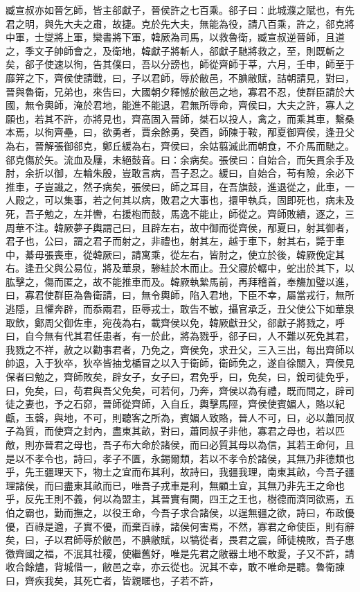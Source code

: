 \begin{pinyinscope}
臧宣叔亦如晉乞師，皆主郤獻子，晉侯許之七百乘。郤子曰：此城濮之賦也，有先君之明，與先大夫之肅，故捷。克於先大夫，無能為役，請八百乘，許之，郤克將中軍，士燮將上軍，欒書將下軍，韓厥為司馬，以救魯衛，臧宣叔逆晉師，且道之，季文子帥師會之，及衛地，韓獻子將斬人，郤獻子馳將救之，至，則既斬之矣，郤子使速以徇，告其僕曰，吾以分謗也，師從齊師于莘，六月，壬申，師至于靡笄之下，齊侯使請戰，曰，子以君師，辱於敝邑，不腆敝賦，詰朝請見，對曰，晉與魯衛，兄弟也，來告曰，大國朝夕釋憾於敝邑之地，寡君不忍，使群臣請於大國，無令輿師，淹於君地，能進不能退，君無所辱命，齊侯曰，大夫之許，寡人之願也，若其不許，亦將見也，齊高固入晉師，桀石以投人，禽之，而乘其車，繫桑本焉，以徇齊壘，曰，欲勇者，賈余餘勇，癸酉，師陳于鞍，邴夏御齊侯，逢丑父為右，晉解張御郤克，鄭丘緩為右，齊侯曰，余姑翦滅此而朝食，不介馬而馳之。郤克傷於矢。流血及屨，未絕鼓音。曰：余病矣。張侯曰：自始合，而矢貫余手及肘，余折以御，左輪朱殷，豈敢言病，吾子忍之。緩曰，自始合，苟有險，余必下推車，子豈識之，然子病矣，張侯曰，師之耳目，在吾旗鼓，進退從之，此車，一人殿之，可以集事，若之何其以病，敗君之大事也，擐甲執兵，固即死也，病未及死，吾子勉之，左并轡，右援枹而鼓，馬逸不能止，師從之。齊師敗績，逐之，三周華不注。韓厥夢子輿謂己曰，且辟左右，故中御而從齊侯，邴夏曰，射其御者，君子也，公曰，謂之君子而射之，非禮也，射其左，越于車下，射其右，斃于車中，綦毋張喪車，從韓厥曰，請寓乘，從左右，皆肘之，使立於後，韓厥俛定其右。逢丑父與公易位，將及華泉，驂絓於木而止。丑父寢於轏中，蛇出於其下，以肱擊之，傷而匿之，故不能推車而及。韓厥執縶馬前，再拜稽首，奉觴加璧以進，曰，寡君使群臣為魯衛請，曰，無令輿師，陷入君地，下臣不幸，屬當戎行，無所逃隱，且懼奔辟，而忝兩君，臣辱戎士，敢告不敏，攝官承乏，丑父使公下如華泉取飲，鄭周父御佐車，宛茷為右，載齊侯以免，韓厥獻丑父，郤獻子將戮之，呼曰，自今無有代其君任患者，有一於此，將為戮乎，郤子曰，人不難以死免其君，我戮之不祥，赦之以勸事君者，乃免之，齊侯免，求丑父，三入三出，每出齊師以帥退，入于狄卒，狄卒皆抽戈楯冒之以入于衛師，衛師免之，遂自徐關入，齊侯見保者曰勉之，齊師敗矣，辟女子，女子曰，君免乎，曰，免矣，曰，銳司徒免乎，曰，免矣，曰，苟君與吾父免矣，可若何，乃奔，齊侯以為有禮，既而問之，辟司徒之妻也，予之石窌，晉師從齊師，入自丘，輿擊馬陘，齊侯使賓媚人，賂以紀甗，玉磬，與地，不可，則聽客之所為，賓媚人致賂，晉人不可，曰，必以蕭同叔子為質，而使齊之封內，盡東其畝，對曰，蕭同叔子非他，寡君之母也，若以匹敵，則亦晉君之母也，吾子布大命於諸侯，而曰必質其母以為信，其若王命何，且是以不孝令也，詩曰，孝子不匱，永錫爾類，若以不孝令於諸侯，其無乃非德類也乎，先王疆理天下，物土之宜而布其利，故詩曰，我疆我理，南東其畝，今吾子疆理諸侯，而曰盡東其畝而已，唯吾子戎車是利，無顧土宜，其無乃非先王之命也乎，反先王則不義，何以為盟主，其晉實有闕，四王之王也，樹德而濟同欲焉，五伯之霸也，勤而撫之，以役王命，今吾子求合諸侯，以逞無疆之欲，詩曰，布政優優，百祿是遒，子實不優，而棄百祿，諸侯何害焉，不然，寡君之命使臣，則有辭矣，曰，子以君師辱於敝邑，不腆敝賦，以犒從者，畏君之震，師徒橈敗，吾子惠徼齊國之福，不泯其社稷，使繼舊好，唯是先君之敝器土地不敢愛，子又不許，請收合餘燼，背城借一，敝邑之幸，亦云從也。況其不幸，敢不唯命是聽。魯衛諫曰，齊疾我矣，其死亡者，皆親暱也，子若不許，
\end{pinyinscope}
